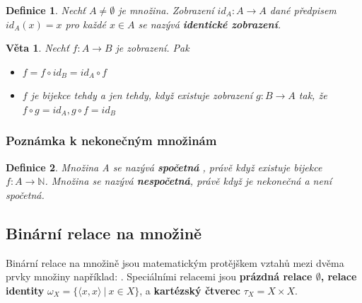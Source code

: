 \documentclass[12pt,a4paper]{article}
\newtheorem{definition}{Definice}
\newtheorem{sentence}{Věta}
\begin{document}
\begin{definition}
	Nechť $A \not= \emptyset$ je množina. Zobrazení $id_A : A \rightarrow A$ dané předpisem $id_A(x) = x$ pro každé $x \in A$ se nazývá \textbf{identické zobrazení}.
\end{definition}

\begin{sentence}
	Nechť $f : A \rightarrow B$ je zobrazení. Pak
	\begin{itemize}
		\item[a)] $f = f \circ id_B = id_A \circ f$
		\item[b)] $f$ je bijekce tehdy a jen tehdy, když existuje zobrazení $g : B \rightarrow A$ tak, že $f \circ g = id_A, g \circ f = id_B$
	\end{itemize}
\end{sentence}


\subsubsection{Poznámka k nekonečným množinám}
\begin{definition}
	Množina A se nazývá \textbf{spočetná} , právě když existuje bijekce $f : A \rightarrow \mathbb{N}$. Množina se nazývá \textbf{nespočetná}, právě když je nekonečná a není spočetná.
\end{definition}

\subsection{Binární relace na množině}
Binární relace na množině jsou matematickým protějškem vztahů mezi dvěma prvky množiny například: . Speciálními relacemi jsou \textbf{prázdná relace $\emptyset$, relace identity} $\omega_X = \{ \langle x, x \rangle \ | \ x \in X \}$, a \textbf{kartézský čtverec} $\tau_X = X \times X$.
\end{document}
